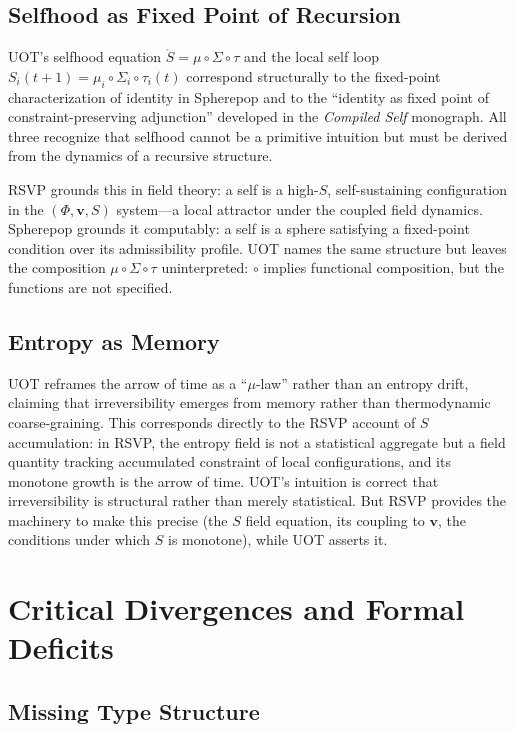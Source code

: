 \documentclass[12pt, oneside]{article}
\theoremstyle{plain-remark}
\newcommand{\utau}{\tau}
\newcommand{\uSigma}{\Sigma}
\newcommand{\umu}{\mu}
\newcommand{\uS}{\mathring{S}}
\newcommand{\Phif}{\Phi}
\newcommand{\vf}{\mathbf{v}}
\newcommand{\Sf}{S}
\begin{document}
\subsection{Selfhood as Fixed Point of Recursion}

UOT's selfhood equation $\uS = \umu \circ \uSigma \circ \utau$ and the local self loop
$S_i(t+1) = \umu_i \circ \uSigma_i \circ \utau_i(t)$ correspond structurally to the
fixed-point characterization of identity in Spherepop and to the ``identity as fixed
point of constraint-preserving adjunction'' developed in the \emph{Compiled Self}
monograph. All three recognize that selfhood cannot be a primitive intuition but must
be derived from the dynamics of a recursive structure.

RSVP grounds this in field theory: a self is a high-$\Sf$, self-sustaining configuration
in the $(\Phif, \vf, \Sf)$ system---a local attractor under the coupled field dynamics.
Spherepop grounds it computably: a self is a sphere satisfying a fixed-point condition
over its admissibility profile. UOT names the same structure but leaves the composition
$\umu \circ \uSigma \circ \utau$ uninterpreted: $\circ$ implies functional composition,
but the functions are not specified.

\subsection{Entropy as Memory}

UOT reframes the arrow of time as a ``$\umu$-law'' rather than an entropy drift,
claiming that irreversibility emerges from memory rather than thermodynamic coarse-graining.
This corresponds directly to the RSVP account of $\Sf$ accumulation: in RSVP, the entropy
field is not a statistical aggregate but a field quantity tracking accumulated constraint
of local configurations, and its monotone growth is the arrow of time. UOT's intuition
is correct that irreversibility is structural rather than merely statistical. But RSVP
provides the machinery to make this precise (the $\Sf$ field equation, its coupling to
$\vf$, the conditions under which $\Sf$ is monotone), while UOT asserts it.


\section{Critical Divergences and Formal Deficits}

\subsection{Missing Type Structure}
\end{document}
